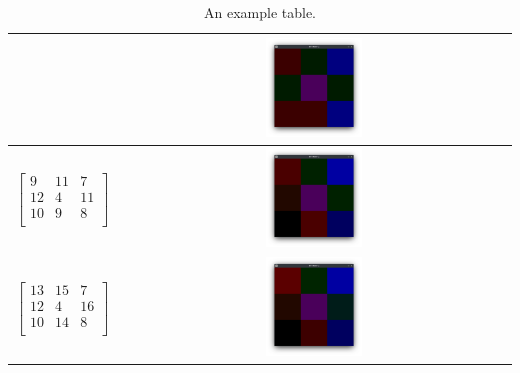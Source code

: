 \begin{table}
\begin{tabular}{|c|c|}
\begin{equation*}
        \end{equation*}
        &
        \includegraphics[width=0.25\textwidth]{./latex/img/m2}
        \\
        \hline
        \begin{equation*}
            \begin{bmatrix}
                9  & 11 & 7  \\
                12 & 4  & 11 \\
                10 & 9  & 8  \\
            \end{bmatrix}
        \end{equation*}
        &
        \includegraphics[width=0.25\textwidth]{./latex/img/m3}
        \\
        \hline
        \begin{equation*}
            \begin{bmatrix}
                13 & 15 & 7  \\
                12 & 4  & 16 \\
                10 & 14 & 8  \\
            \end{bmatrix}
        \end{equation*}
        &
        \includegraphics[width=0.25\textwidth]{./latex/img/m4}
        \\
        \hline
    \end{tabular}
    \caption{\label{tab:widgets}An example table.}
\end{table}


